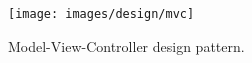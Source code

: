 
\begin{figure}[H]
	\centering
    \texttt{[image: images/design/mvc]}
    \caption{Model-View-Controller design pattern.}
    \label{fig:mvc}
\end{figure}
